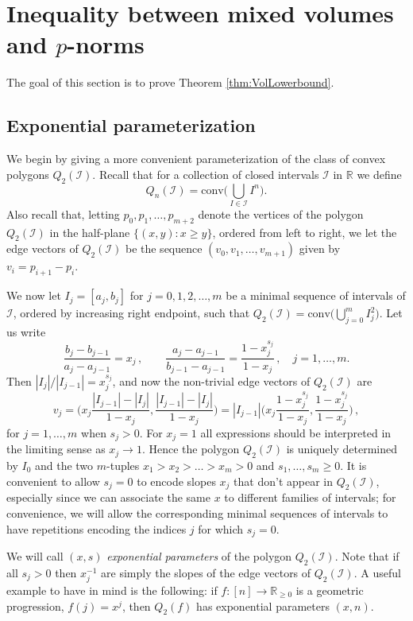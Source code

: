 \documentclass[a4paper,reqno,12pt]{amsart}
\newcommand{\I}{\mathscr{I}}
\renewcommand{\r}{\mathbb{R}}
\newcommand{\1}{\bo{1}}
\begin{document}
\section{Inequality between mixed volumes and \texorpdfstring{$p$}{p}-norms} \label{sec:ineqB}
The goal of this section is to prove Theorem \ref{thm:VolLowerbound}. 
\subsection{Exponential parameterization}
We begin by giving a more convenient parameterization of the class of convex polygons $Q_2(\I)$. Recall that for a collection of closed intervals $\I$ in $\r$ we define
	\[Q_n(\I)= \mathrm{conv}\Big(\bigcup_{I\in\I}I^n\Big). \]
Also recall that, letting $p_0,p_1,\dots,p_{m+2}$ denote the vertices of the polygon $Q_2(\I)$ in the half-plane $\{(x,y)\colon x\ge y\}$, ordered from left to right, we let the edge vectors of $Q_2(\I)$ be the sequence $(v_0,v_1,\dots,v_{m+1})$ given by $v_i=p_{i+1}-p_i$.

We now let $I_j=[a_j,b_j]$ for $j=0,1,2,\dots,m$ be a minimal sequence of intervals of $\I$, ordered by increasing right endpoint, such that $Q_2(\I)= \mathrm{conv}\Big(\bigcup_{j=0}^m I_j^2\Big)$. Let us write
	\[\frac{b_j-b_{j-1}}{a_j-a_{j-1}}=x_j\,,\qquad\frac{a_j-a_{j-1}}{b_{j-1}-a_{j-1}}=\frac{1-x_j^{s_j}}{1-x_j}\,,\quad j=1,\dots,m.\]
Then $|I_j|/|I_{j-1}|=x_j^{s_j}$, and now the non-trivial edge vectors of $Q_2(\I)$ are
	\[v_j=\bigg(x_j\frac{|I_{j-1}|-|I_j|}{1-x_j}, \frac{|I_{j-1}|-|I_j|}{1-x_j}\bigg) = 
	        |I_{j-1}|\bigg(x_j\frac{1-x_j^{s_j}}{1-x_j}, \frac{1-x_j^{s_j}}{1-x_j}\bigg)\,,\]
for $j=1,\dots,m$ when $s_j>0$. For $x_j=1$ all expressions should be interpreted in the limiting sense as $x_j\to1$. Hence the polygon $Q_2(\I)$ is uniquely determined by $I_0$ and the two $m$-tuples $x_1> x_2> \dots > x_m > 0$ and $s_1,\dots,s_m\ge0$. It is convenient to allow $s_j=0$ to encode slopes $x_j$ that don't appear in $Q_2(\I)$, especially since we can associate the same $x$ to different families of intervals; for convenience, we will allow the corresponding minimal sequences of intervals to have repetitions encoding the indices $j$ for which $s_j=0$. 

We will call $(x,s)$ \emph{exponential parameters} of the polygon $Q_2(\I)$. Note that if all $s_j>0$ then $x_j^{-1}$ are simply the slopes of the edge vectors of $Q_2(\I)$. A useful example to have in mind is the following: if $f\colon[n]\to\r_{\ge0}$ is a geometric progression, $f(j)=x^j$, then $Q_2(f)$ has exponential parameters $(x,n)$.
\end{document}
